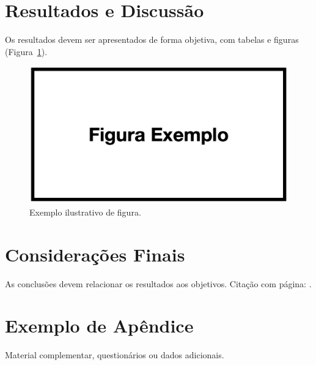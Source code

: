 \documentclass[12pt,oneside]{abntex2}
\begin{document}
\section{Resultados e Discussão}
Os resultados devem ser apresentados de forma objetiva, com tabelas e figuras (Figura~\ref{fig:exemplo}).

\begin{figure}[ht]
  \centering
  \includegraphics[width=.9\textwidth]{figura.png}
  \caption{Exemplo ilustrativo de figura.}
  \label{fig:exemplo}
\end{figure}

\section{Considerações Finais}
As conclusões devem relacionar os resultados aos objetivos.  
Citação com página: \cite[p.~25]{azumaRecentAdvancesAugmentedReality2001}.

\printbibliography

\appendix
\renewcommand{\thesection}{Apêndice \Alph{section}}

\section{Exemplo de Apêndice}
Material complementar, questionários ou dados adicionais.
\end{document}

